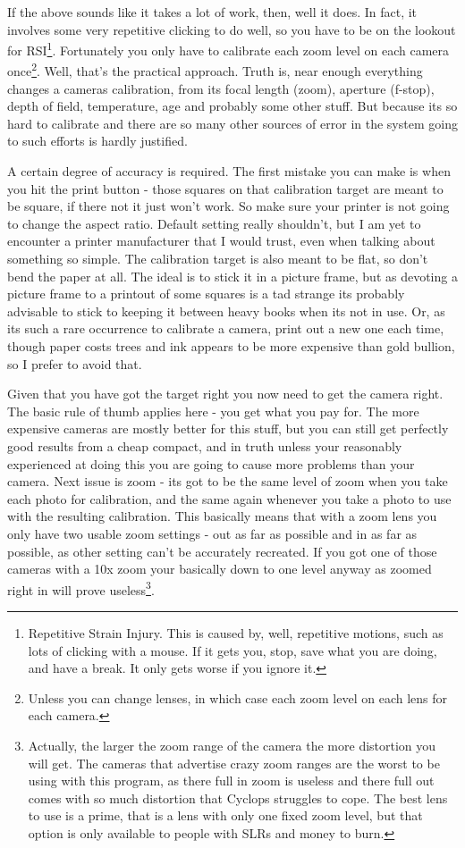 \documentclass[10pt,a4paper,twoside]{article}
\begin{document}
If the above sounds like it takes a lot of work, then, well it does. In fact, it involves some very repetitive clicking to do well, so you have to be on the lookout for RSI\footnote{Repetitive Strain Injury. This is caused by, well, repetitive motions, such as lots of clicking with a mouse. If it gets you, stop, save what you are doing, and have a break. It only gets worse if you ignore it.}. Fortunately you only have to calibrate each zoom level on each camera once\footnote{Unless you can change lenses, in which case each zoom level on each lens for each camera.}. Well, that's the practical approach. Truth is, near enough everything changes a cameras calibration, from its focal length (zoom), aperture (f-stop), depth of field, temperature, age and probably some other stuff. But because its so hard to calibrate and there are so many other sources of error in the system going to such efforts is hardly justified.

A certain degree of accuracy is required. The first mistake you can make is when you hit the print button - those squares on that calibration target are meant to be square, if there not it just won't work. So make sure your printer is not going to change the aspect ratio. Default setting really shouldn't, but I am yet to encounter a printer manufacturer that I would trust, even when talking about something so simple. The calibration target is also meant to be flat, so don't bend the paper at all. The ideal is to stick it in a picture frame, but as devoting a picture frame to a printout of some squares is a tad strange its probably advisable to stick to keeping it between heavy books when its not in use. Or, as its such a rare occurrence to calibrate a camera, print out a new one each time, though paper costs trees and ink appears to be more expensive than gold bullion, so I prefer to avoid that.

Given that you have got the target right you now need to get the camera right. The basic rule of thumb applies here - you get what you pay for. The more expensive cameras are mostly better for this stuff, but you can still get perfectly good results from a cheap compact, and in truth unless your reasonably experienced at doing this you are going to cause more problems than your camera. Next issue is zoom - its got to be the same level of zoom when you take each photo for calibration, and the same again whenever you take a photo to use with the resulting calibration. This basically means that with a zoom lens you only have two usable zoom settings - out as far as possible and in as far as possible, as other setting can't be accurately recreated. If you got one of those cameras with a 10x zoom your basically down to one level anyway as zoomed right in will prove useless\footnote{Actually, the larger the zoom range of the camera the more distortion you will get. The cameras that advertise crazy zoom ranges are the worst to be using with this program, as there full in zoom is useless and there full out comes with so much distortion that Cyclops struggles to cope. The best lens to use is a prime, that is a lens with only one fixed zoom level, but that option is only available to people with SLRs and money to burn.}.
\end{document}
